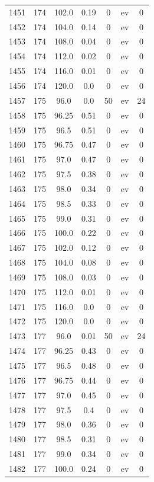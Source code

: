 \documentclass[12pt,a4paper]{article}
\begin{document}
\begin{tabular}{r|cccccc}
	1451 & 174 & 102.0 & 0.19 & 0 & ev & 0 \\
	1452 & 174 & 104.0 & 0.14 & 0 & ev & 0 \\
	1453 & 174 & 108.0 & 0.04 & 0 & ev & 0 \\
	1454 & 174 & 112.0 & 0.02 & 0 & ev & 0 \\
	1455 & 174 & 116.0 & 0.01 & 0 & ev & 0 \\
	1456 & 174 & 120.0 & 0.0 & 0 & ev & 0 \\
	1457 & 175 & 96.0 & 0.0 & 50 & ev & 24 \\
	1458 & 175 & 96.25 & 0.51 & 0 & ev & 0 \\
	1459 & 175 & 96.5 & 0.51 & 0 & ev & 0 \\
	1460 & 175 & 96.75 & 0.47 & 0 & ev & 0 \\
	1461 & 175 & 97.0 & 0.47 & 0 & ev & 0 \\
	1462 & 175 & 97.5 & 0.38 & 0 & ev & 0 \\
	1463 & 175 & 98.0 & 0.34 & 0 & ev & 0 \\
	1464 & 175 & 98.5 & 0.33 & 0 & ev & 0 \\
	1465 & 175 & 99.0 & 0.31 & 0 & ev & 0 \\
	1466 & 175 & 100.0 & 0.22 & 0 & ev & 0 \\
	1467 & 175 & 102.0 & 0.12 & 0 & ev & 0 \\
	1468 & 175 & 104.0 & 0.08 & 0 & ev & 0 \\
	1469 & 175 & 108.0 & 0.03 & 0 & ev & 0 \\
	1470 & 175 & 112.0 & 0.01 & 0 & ev & 0 \\
	1471 & 175 & 116.0 & 0.0 & 0 & ev & 0 \\
	1472 & 175 & 120.0 & 0.0 & 0 & ev & 0 \\
	1473 & 177 & 96.0 & 0.01 & 50 & ev & 24 \\
	1474 & 177 & 96.25 & 0.43 & 0 & ev & 0 \\
	1475 & 177 & 96.5 & 0.48 & 0 & ev & 0 \\
	1476 & 177 & 96.75 & 0.44 & 0 & ev & 0 \\
	1477 & 177 & 97.0 & 0.45 & 0 & ev & 0 \\
	1478 & 177 & 97.5 & 0.4 & 0 & ev & 0 \\
	1479 & 177 & 98.0 & 0.36 & 0 & ev & 0 \\
	1480 & 177 & 98.5 & 0.31 & 0 & ev & 0 \\
	1481 & 177 & 99.0 & 0.34 & 0 & ev & 0 \\
	1482 & 177 & 100.0 & 0.24 & 0 & ev & 0 \\

\end{tabular}
\end{document}

